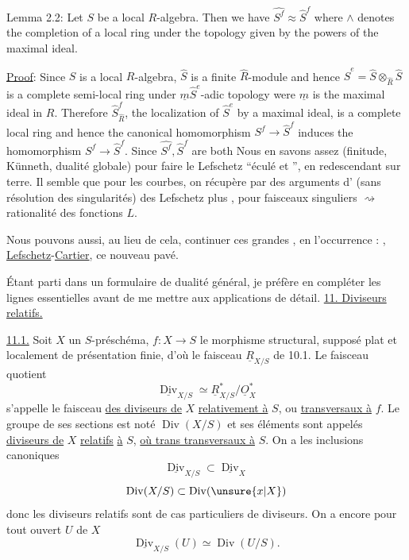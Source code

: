 Lemma 2.2: Let $S$ be a local $R$-algebra. Then we have $\widehat{S^f}\approx\widehat S^f$ where $\wedge$
denotes the completion of a local ring under the topology given by the
powers of the maximal ideal.

\uline{Proof}: Since $S$ is a local $R$-algebra, $\widehat S$ is a finite $\widehat R$-module and hence
$\widehat S^e=\widehat S\otimes_{\widehat R}\widehat S$ is a complete semi-local ring under $\underline m\widehat S^e$-adic topology were $\underline m$ is
the maximal ideal in $R$. Therefore $\widehat S_{\widehat R}^f$, the localization of $\widehat S^e$ by a maximal
ideal, is a complete local ring and hence the canonical homomorphism
$S^f\longrightarrow\widehat S^f$ induces the homomorphism $\widehat{S^f}\longrightarrow\widehat S^f$. Since $\widehat{S^f},\widehat S^f$ are both
Nous en savons assez (finitude, Künneth, dualité
globale) pour faire le Lefschetz ``éculé et '',
en redescendant sur terre. Il semble que pour les
courbes, on récupère par des arguments d'
(sans résolution des singularités) des Lefschetz plus
, pour faisceaux singuliers $\rightsquigarrow$
rationalité des fonctions $L$.

Nous pouvons aussi, au lieu de cela,
continuer ces grandes , en l'occurrence :
, 
\uline{Lefschetz}-\uline{Cartier}, 
 ce nouveau pavé.

Étant parti dans un formulaire de dualité
général, je préfère en compléter les lignes essentielles
avant de  me mettre aux applications de
détail.
\uline{11. Diviseurs relatifs.}

\uline{11.1.} Soit $X$ un $S$-préschéma, $f:X\longrightarrow S$ le morphisme
structural, supposé plat et localement de présentation finie,
d'où le faisceau $\underline R_{X/S}$ de 10.1. Le faisceau quotient
\[
\underline{\operatorname{Div}}_{X/S}\simeq\underline R_{X/S}^{\ast}/\underline O_X^{\ast}
\]
s'appelle le faisceau \uline{des diviseurs de} $X$ \uline{relativement à} $S$, ou
\uline{transversaux à} $f$. Le groupe de ses sections est noté
$\operatorname{Div}(X/S)$ et ses éléments sont appelés \uline{diviseurs de} $X$ \uline{relatifs}
\uline{à} $S$, \uline{où trans transversaux à} $S$. On a les inclusions canoniques
\[
\underline{\operatorname{Div}}_{X/S}\subset\underline{\operatorname{Div}}_X
\]
\[
\operatorname{Div}(X/S)\subset\operatorname{Div}(\unsure{x|X})
\]
donc les diviseurs relatifs sont de cas particuliers de diviseurs.
On a encore pour tout ouvert $U$ de $X$
\[
\underline{\operatorname{Div}}_{X/S}(U)\simeq\operatorname{Div}(U/S).
\]

